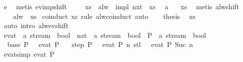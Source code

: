 \begin{isabellebody}
\ e\ \isamarkupfalse%
\ {\isacharparenleft}metis\ ev{\isacharunderscore}imp{\isacharunderscore}shift{\isacharparenright}\isanewline
\ \ \isamarkupfalse%
\ {\isachardoublequoteopen}{\isasymphi}\ xs{}\ {\isasymand}\ alw\ {\isacharparenleft}{\isasymphi}\ impl\ {\isacharparenleft}nxt\ {\isasymphi}{\isacharparenright}{\isacharparenright}\ xs{}{\isachardoublequoteclose}\ \isamarkupfalse%
\ a\ {\isasymphi}\ \isamarkupfalse%
\ xs\ \isamarkupfalse%
\ {\isacharparenleft}metis\ alw{\isacharunderscore}shift{\isacharparenright}\isanewline
\ \ \isamarkupfalse%
\ {\isachardoublequoteopen}alw\ {\isasymphi}\ xs{}{\isachardoublequoteclose}\ \isamarkupfalse%
{\isacharparenleft}coinduct\ xs{}\ rule{\isacharcolon}\ alw{\isachardot}coinduct{\isacharparenright}\ auto\isanewline
\ \ \isamarkupfalse%
\ {\isacharquery}thesis\ \isamarkupfalse%
\ xs\ \isamarkupfalse%
\ {\isacharparenleft}auto\ intro{\isacharcolon}\ alw{\isacharunderscore}ev{\isacharunderscore}shift{\isacharparenright}\isanewline
{}\isamarkupfalse%
%
\endisatagproof
{\isafoldproof}%
%
\isadelimproof
\isanewline
%
\endisadelimproof
\isanewline
\isanewline
{}\isamarkupfalse%
\ ev{\isacharunderscore}at\ {\isacharcolon}{\isacharcolon}\ {\isachardoublequoteopen}{\isacharparenleft}{\isacharprime}a\ stream\ {\isasymRightarrow}\ bool{\isacharparenright}\ {\isasymRightarrow}\ nat\ {\isasymRightarrow}\ {\isacharprime}a\ stream\ {\isasymRightarrow}\ bool{\isachardoublequoteclose}\ \ P\ {\isacharcolon}{\isacharcolon}\ {\isachardoublequoteopen}{\isacharprime}a\ stream\ {\isasymRightarrow}\ bool{\isachardoublequoteclose}\ \isanewline
\ \ base{\isacharcolon}\ {\isachardoublequoteopen}P\ {\isasymomega}\ {\isasymLongrightarrow}\ ev{\isacharunderscore}at\ P\ {}\ {\isasymomega}{\isachardoublequoteclose}\isanewline
{\isacharbar}\ step{\isacharcolon}{\isachardoublequoteopen}{\isasymnot}\ P\ {\isasymomega}\ {\isasymLongrightarrow}\ ev{\isacharunderscore}at\ P\ n\ {\isacharparenleft}stl\ {\isasymomega}{\isacharparenright}\ {\isasymLongrightarrow}\ ev{\isacharunderscore}at\ P\ {\isacharparenleft}Suc\ n{\isacharparenright}\ {\isasymomega}{\isachardoublequoteclose}\isanewline
\isanewline
{}\isamarkupfalse%
\ ev{\isacharunderscore}at{\isacharunderscore}{}{\isacharbrackleft}simp{\isacharbrackright}{\isacharcolon}\ {\isachardoublequoteopen}ev{\isacharunderscore}at\ P\ {}\ {\isasymomega}{\isachardoublequoteclose}\isanewline

\end{isabellebody}
